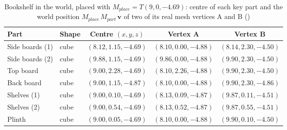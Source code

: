 \begin{table}[H]\centering\footnotesize
\caption{Bookshelf in the world, placed with $M_{place}=T(9, 0, -4.69)$: centre of each key part and the world position $M_{place}\,M_{part}\,\mathbf{v}$ of two of its real mesh vertices A and B ()}\label{tab:world_bookshelf}
\begin{tabular}{@{}l l c c c@{}}
\toprule
Part & Shape & Centre $(x,y,z)$ & Vertex A & Vertex B \\
\midrule
Side boards (1) & cube & $(8.12, 1.15, -4.69)$ & $(8.10, 0.00, -4.88)$ & $(8.14, 2.30, -4.50)$ \\
Side boards (2) & cube & $(9.88, 1.15, -4.69)$ & $(9.86, 0.00, -4.88)$ & $(9.90, 2.30, -4.50)$ \\
Top board & cube & $(9.00, 2.28, -4.69)$ & $(8.10, 2.26, -4.88)$ & $(9.90, 2.30, -4.50)$ \\
Back board & cube & $(9.00, 1.15, -4.87)$ & $(8.10, 0.00, -4.88)$ & $(9.90, 2.30, -4.86)$ \\
Shelves (1) & cube & $(9.00, 0.10, -4.69)$ & $(8.13, 0.09, -4.87)$ & $(9.87, 0.11, -4.51)$ \\
Shelves (2) & cube & $(9.00, 0.54, -4.69)$ & $(8.13, 0.52, -4.87)$ & $(9.87, 0.55, -4.51)$ \\
Plinth & cube & $(9.00, 0.05, -4.69)$ & $(8.10, 0.00, -4.88)$ & $(9.90, 0.10, -4.50)$ \\
\bottomrule
\end{tabular}
\end{table}
